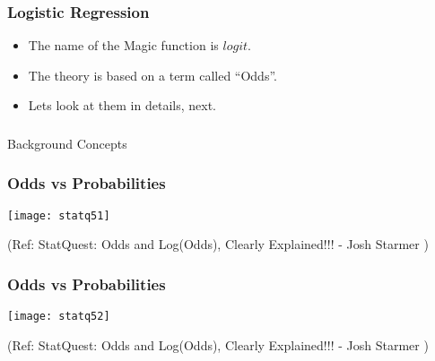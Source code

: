 \begin{frame}[fragile]\frametitle{Logistic Regression}
 \begin{itemize}
\item The name of the Magic function is $logit$.
\item The theory is based on a term called ``Odds''.
\item Lets look at them in details, next.
\end{itemize}

\end{frame}


\begin{frame}[fragile]\frametitle{}
\begin{center}
{\Large Background Concepts}
\end{center}
\end{frame}


\begin{frame}[fragile]\frametitle{Odds vs Probabilities}

\begin{center}
\texttt{[image: statq51]}
\end{center}

\tiny{(Ref: StatQuest: Odds and Log(Odds), Clearly Explained!!! - Josh Starmer )}
\end{frame}


\begin{frame}[fragile]\frametitle{Odds vs Probabilities}

\begin{center}
\texttt{[image: statq52]}
\end{center}

\tiny{(Ref: StatQuest: Odds and Log(Odds), Clearly Explained!!! - Josh Starmer )}
\end{frame}



